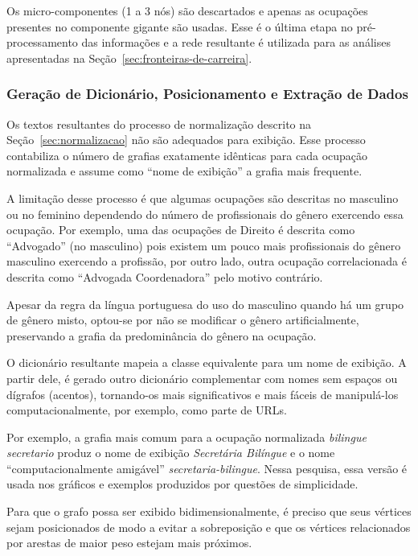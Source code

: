 \documentclass[12pt,a4paper]{article}
\begin{document}
Os micro-componentes (1 a 3 nós) são descartados e apenas as ocupações presentes no componente gigante são usadas. Esse é o última etapa no pré-processamento das informações e a rede resultante é utilizada para as análises apresentadas na Seção~\ref{sec:fronteiras-de-carreira}.


\subsubsection{Geração de Dicionário, Posicionamento e Extração de Dados} \label{sec:criar-dicionario}

Os textos resultantes do processo de normalização descrito na Seção~\ref{sec:normalizacao} não são adequados para exibição. Esse processo contabiliza o número de grafias exatamente idênticas para cada ocupação normalizada e assume como \enquote{nome de exibição} a grafia mais frequente.

A limitação desse processo é que algumas ocupações são descritas no masculino ou no feminino dependendo do número de profissionais do gênero exercendo essa ocupação. Por exemplo, uma das ocupações de Direito é descrita como \enquote{Advogado} (no masculino) pois existem um pouco mais profissionais do gênero masculino exercendo a profissão, por outro lado, outra ocupação correlacionada é descrita como \enquote{Advogada Coordenadora} pelo motivo contrário.

Apesar da regra da língua portuguesa do uso do masculino quando há um grupo de gênero misto, optou-se por não se modificar o gênero artificialmente, preservando a grafia da predominância do gênero na ocupação.

O dicionário resultante mapeia a classe equivalente para um nome de exibição. A partir dele, é gerado outro dicionário complementar com nomes sem espaços ou dígrafos (acentos), tornando-os mais significativos e mais fáceis de manipulá-los computacionalmente, por exemplo, como parte de URLs.

Por exemplo, a grafia mais comum para a ocupação normalizada \textit{bilingue secretario} produz o nome de exibição \textit{Secretária Bilíngue} e o nome \enquote{computacionalmente amigável} \textit{secretaria-bilingue}. Nessa pesquisa, essa versão é usada nos gráficos e exemplos produzidos por questões de simplicidade.

Para que o grafo possa ser exibido bidimensionalmente, é preciso que seus vértices sejam posicionados de modo a evitar a sobreposição e que os vértices relacionados por arestas de maior peso estejam mais próximos.
\end{document}
